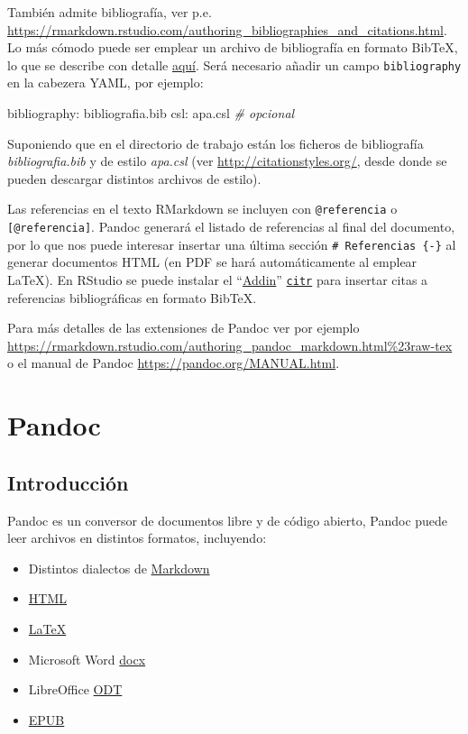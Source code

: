 \documentclass[]{book}
\newenvironment{Shaded}{\begin{snugshade}}{\end{snugshade}}
\newcommand{\CommentTok}[1]{\textcolor[rgb]{0.56,0.35,0.01}{\textit{#1}}}
\newcommand{\FunctionTok}[1]{\textcolor[rgb]{0.00,0.00,0.00}{#1}}
\newcommand{\AttributeTok}[1]{\textcolor[rgb]{0.77,0.63,0.00}{#1}}
\theoremstyle{definition}
\theoremstyle{definition}
\theoremstyle{definition}
\theoremstyle{remark}
\begin{document}
También admite bibliografía, ver p.e.
\url{https://rmarkdown.rstudio.com/authoring_bibliographies_and_citations.html}.
Lo más cómodo puede ser emplear un archivo de bibliografía en formato
BibTeX, lo que se describe con detalle
\href{https://bookdown.org/yihui/bookdown/citations.html}{aquí}. Será
necesario añadir un campo \texttt{bibliography} en la cabezera YAML, por
ejemplo:

\begin{Shaded}
\begin{Highlighting}[]
\FunctionTok{bibliography:}\AttributeTok{ bibliografia.bib}
\FunctionTok{csl:}\AttributeTok{ apa.csl  }\CommentTok{# opcional}
\end{Highlighting}
\end{Shaded}

Suponiendo que en el directorio de trabajo están los ficheros de
bibliografía \emph{bibliografia.bib} y de estilo \emph{apa.csl} (ver
\url{http://citationstyles.org/}, desde donde se pueden descargar
distintos archivos de estilo).

Las referencias en el texto RMarkdown se incluyen con
\texttt{@referencia} o \texttt{{[}@referencia{]}}. Pandoc generará el
listado de referencias al final del documento, por lo que nos puede
interesar insertar una última sección \texttt{\#\ Referencias\ \{-\}} al
generar documentos HTML (en PDF se hará automáticamente al emplear
LaTeX). En RStudio se puede instalar el
``\href{https://rstudio.github.io/rstudioaddins/}{Addin}''
\href{https://github.com/crsh/citr}{\texttt{citr}} para insertar citas a
referencias bibliográficas en formato BibTeX.

Para más detalles de las extensiones de Pandoc ver por ejemplo
\url{https://rmarkdown.rstudio.com/authoring_pandoc_markdown.html\%23raw-tex}
o el manual de Pandoc \url{https://pandoc.org/MANUAL.html}.

\chapter{Pandoc}\label{pandoc}

\section{Introducción}\label{introduccion-2}

Pandoc es un conversor de documentos libre y de código abierto, Pandoc
puede leer archivos en distintos formatos, incluyendo:

\begin{itemize}
\item
  Distintos dialectos de
  \href{http://daringfireball.net/projects/markdown/}{Markdown}
\item
  \href{http://www.w3.org/TR/html40/}{HTML}
\item
  \href{http://www.latex-project.org/}{LaTeX}
\item
  Microsoft Word
  \href{https://en.wikipedia.org/wiki/Office_Open_XML}{docx}
\item
  LibreOffice \href{http://en.wikipedia.org/wiki/OpenDocument}{ODT}
\item
  \href{http://en.wikipedia.org/wiki/EPUB}{EPUB}
\end{itemize}
\end{document}
